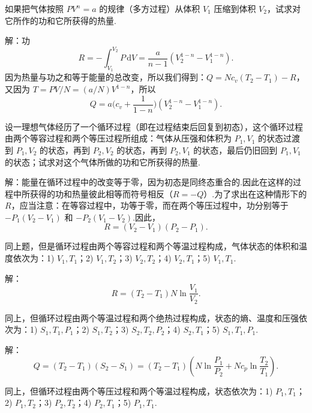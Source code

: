 \begin{xiti}
\quad 如果把气体按照 $PV^n=a$ 的规律（多方过程）从体积 $V_1$ 压缩到体积 $V_2$，试求对它所作的功和它所获得的热量.

解：功
\begin{equation*}
  R=-\int_{V_1}^{V_2}P\,\mathrm{d}V
  =\frac{a}{n-1}\left(V_2^{1-n}-V_1^{1-n}\right).
\end{equation*}
因为热量与功之和等于能量的总改变，所以我们得到：$Q=Nc_v(T_2-T_1)-R$，又因为 $T=PV/N=(a/N)V^{1-n}$，所以
\begin{equation*}
  Q=a\Big(c_v+\frac{1}{1-n}\Big)
  \left(V_2^{1-n}-V_1^{1-n}\right).
\end{equation*}

\quad 设一理想气体经历了一个循环过程（即在过程结束后回复到初态），这个循环过程由两个等容过程和两个等压过程所组成：气体从压强和体积为 $P_1,V_1$ 的状态过渡到 $P_1,V_2$ 的状态，再到 $P_2,V_2$ 的状态，再到 $P_2,V_1$ 的状态，最后仍旧回到 $P_1,V_1$ 的状态；试求对这个气体所做的功和它所获得的热量.

解：能量在循环过程中的改变等于零，因为初态是同终态重合的.因此在这样的过程中所获得的功和热量彼此相等而符号相反（$R=-Q$）.为了求出在这种情形下的 $R$，应当注意：在等容过程中，功等于零，而在两个等压过程中，功分别等于 $-P_1(V_2-V_1)$ 和 $-P_2(V_1-V_2)$.因此，
\begin{equation*}
  R=\left(V_2-V_1\right)\left(P_2-P_1\right).
\end{equation*}

\quad 同上题，但是循环过程由两个等容过程和两个等温过程构成，气体状态的体积和温度依次为：1) $V_1,T_1$；2) $V_1,T_2$；3) $V_2,T_2$；4) $V_2,T_1$；5) $V_1,T_1$.

解：
\begin{equation*}
  R=\left(T_2-T_1\right)N\ln\frac{V_1}{V_2}.
\end{equation*}

\quad 同上，但循环过程由两个等温过程和两个绝热过程构成，状态的熵、温度和压强依次为：1) $S_1,T_1,P_1$；2) $S_1,T_2$；3) $S_2,T_2,P_2$；4) $S_2,T_1$；5) $S_1,T_1,P_1$.

解：
\begin{equation*}
  Q=\left(T_2-T_1\right)\left(S_2-S_1\right)
  =\left(T_2-T_1\right)\left(N\ln\frac{P_1}{P_2}
  +Nc_p\ln\frac{T_2}{T_1}\right).
\end{equation*}

\quad 同上，但循环过程由两个等压过程和两个等温过程构成，状态依次为：1) $P_1,T_1$；2) $P_1,T_2$；3) $P_2,T_2$；4) $P_2,T_1$；5) $P_1,T_1$.


\end{xiti}
